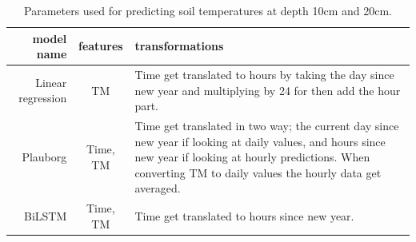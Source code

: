 \begin{table}[H]
	\centering
	\begin{tabular}{|r|c| p{6cm}|}
		\hline model name & features & transformations \\\hline\hline
		Linear regression & TM & Time get translated to hours by taking the day since new year and multiplying by 24 for then add the hour part. \\\hline
		Plauborg & Time, TM & Time get translated in two way; the current day since new year if looking at daily values, and hours since new year if looking at hourly predictions. When converting TM to daily values the hourly data get averaged. \\\hline
		BiLSTM &Time, TM& Time get translated to hours since new year.\\\hline
	\end{tabular}
	\caption[Model parameters]{Parameters used for predicting soil temperatures at depth 10cm and 20cm.}
	\label{tab:model_trans}
\end{table}


